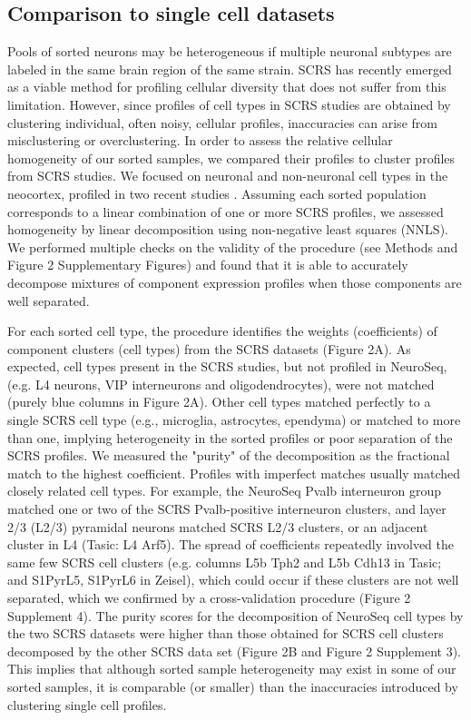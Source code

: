 \subsection{Comparison to single cell datasets}
Pools of sorted neurons may be heterogeneous if multiple neuronal subtypes are labeled in the same brain region of the same strain. SCRS has recently emerged as a viable method for profiling cellular diversity that does not suffer from this limitation. However, since profiles of cell types in SCRS studies are obtained by clustering individual, often noisy, cellular profiles, inaccuracies can arise from misclustering or overclustering. In order to assess the relative cellular homogeneity of our sorted samples, we compared their profiles to cluster profiles from SCRS studies. We focused on neuronal and non-neuronal cell types in the neocortex, profiled in two recent studies \citep{Tasic_2016,Zeisel_2015}. Assuming  each sorted population corresponds to a linear combination of one or more SCRS profiles, we assessed homogeneity by linear decomposition using non-negative least squares (NNLS). We performed multiple checks on the validity of the procedure (see Methods and Figure 2 Supplementary Figures) and found that it is able to accurately decompose mixtures of component expression profiles when those components are well separated. 

For each sorted cell type, the procedure identifies the weights (coefficients) of  component clusters (cell types) from the SCRS datasets (Figure 2A). As expected, cell types present in the SCRS studies, but not profiled in NeuroSeq, (e.g. L4 neurons, VIP interneurons and oligodendrocytes), were not matched (purely blue columns in Figure 2A). Other cell types matched perfectly to a single SCRS cell type (e.g., microglia, astrocytes, ependyma) or matched to more than one, implying heterogeneity in the sorted profiles or poor separation of the SCRS profiles. We measured the "purity" of the decomposition as the fractional match to the highest coefficient. Profiles with imperfect matches usually matched closely related cell types. For example, the NeuroSeq Pvalb interneuron group matched one or two of the SCRS Pvalb-positive interneuron clusters, and layer 2/3 (L2/3) pyramidal neurons matched SCRS L2/3 clusters, or an adjacent cluster in L4 (Tasic: L4 Arf5). The spread of coefficients repeatedly involved the same few SCRS cell clusters (e.g. columns L5b Tph2 and L5b Cdh13 in Tasic; and S1PyrL5,  S1PyrL6 in Zeisel), which could occur if these clusters are not well separated, which we confirmed by a cross-validation procedure (Figure 2 Supplement 4). The purity scores for the decomposition of NeuroSeq cell types by the two SCRS datasets were higher than those obtained for SCRS cell clusters decomposed by the other SCRS data set (Figure 2B and Figure 2 Supplement 3). This implies that although sorted sample heterogeneity may exist in some of our sorted samples, it is comparable (or smaller) than the inaccuracies introduced by clustering single cell profiles. 



